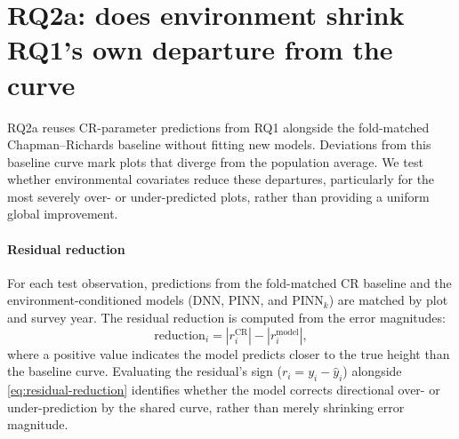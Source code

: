 
\section{RQ2a: does environment shrink RQ1's own departure from the curve}
RQ2a reuses CR-parameter predictions from RQ1 alongside the fold-matched Chapman--Richards baseline without fitting new models. Deviations from this baseline curve mark plots that diverge from the population average. We test whether environmental covariates reduce these departures, particularly for the most severely over- or under-predicted plots, rather than providing a uniform global improvement.

\paragraph*{Residual reduction}
For each test observation, predictions from the fold-matched CR baseline and the environment-conditioned models (DNN, PINN, and PINN$_k$) are matched by plot and survey year. The residual reduction is computed from the error magnitudes:
\begin{equation}
\text{reduction}_i = \left|r_i^{\text{CR}}\right| - \left|r_i^{\text{model}}\right|,
\label{eq:residual-reduction}
\end{equation}
where a positive value indicates the model predicts closer to the true height than the baseline curve. Evaluating the residual's sign ($r_i = y_i - \hat{y}_i$) alongside \eqref{eq:residual-reduction} identifies whether the model corrects directional over- or under-prediction by the shared curve, rather than merely shrinking error magnitude.

